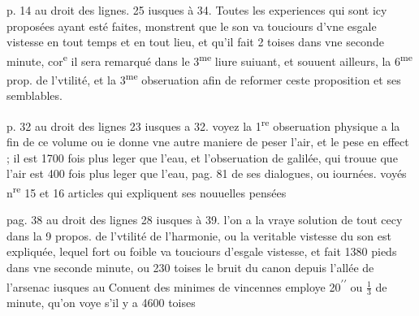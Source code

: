 \documentclass[11pt,a4paper]{article}
\begin{document}

p. 14 au droit des  lignes. 25 iusques à 34.
Toutes les experiences qui sont icy proposées ayant esté faites, monstrent que le son va touciours d'vne esgale vistesse en tout temps et en tout lieu, et qu'il fait 2\ill{} toises dans vne seconde minute, cor\textsuperscript{e} il sera remarqué dans le 3\textsuperscript{me} liure suiuant, et souuent ailleurs,   la 6\textsuperscript{me} prop. de l'vtilité, et la 3\textsuperscript{me} obseruation afin de reformer ceste proposition et ses semblables.



p. 32 au droit des lignes 23 iusques a 32.
voyez la 1\textsuperscript{re} obseruation physique a la fin de ce volume ou ie donne vne autre maniere de peser l'air, et le pese en effect ; il est 1700 fois plus leger que l'eau, et l'obseruation de galilée, qui trouue que l'air est 400 fois plus leger que l'eau, pag. 81 de ses dialogues, ou iournées. voyés n\textsuperscript{re} 15 et 16 articles qui expliquent ses nouuelles pensées

pag. 38 au droit des lignes 28 iusques à 39.
l'on a la vraye solution de tout cecy dans la 9 propos. de l'vtilité de l'harmonie, ou la veritable vistesse du son est expliquée, lequel fort ou foible va touciours d'esgale vistesse, et fait 1380 pieds dans vne seconde minute, ou 230 toises le bruit du canon depuis l'allée de l'arsenac iusques au Conuent des minimes de vincennes employe 20\textsuperscript{$\prime\prime$} ou $\frac{1}{3}$ de minute, qu'on voye s'il y a 4600 toises
\end{document}
